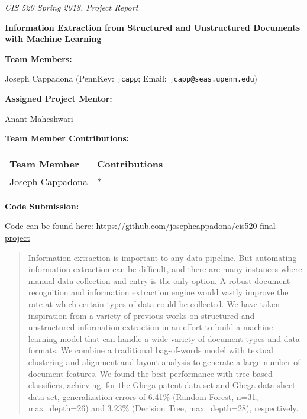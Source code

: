 \documentclass[twoside,11pt]{article}
\renewcommand{\>}{{\rightarrow}}
\newcommand{\1}{{\mathbf 1}}
\newcommand{\0}{{\mathbf 0}}
\begin{document}

\emph{\footnotesize{CIS 520 Spring 2018, Project Report}}

\vspace{12pt}

\textbf{\Large{Information Extraction from Structured and Unstructured Documents with Machine Learning}}

\vspace{1cm}

\textbf{Team Members:}

Joseph Cappadona (PennKey: \texttt{jcapp}; Email: \texttt{jcapp@seas.upenn.edu}) \\


\vspace{2cm}

\textbf{Assigned Project Mentor:}

Anant Maheshwari

\vspace{1cm}

\textbf{Team Member Contributions:}

\begin{center}
\begin{tabular}{|l|l|}
\hline
Team Member & Contributions \\
\hline
Joseph Cappadona & * \\
\hline
\end{tabular}
\end{center}

\vspace{12pt}

\textbf{Code Submission:}

Code can be found here: \url{https://github.com/josephcappadona/cis520-final-project}

\newpage

\begin{abstract}
Information extraction is important to any data pipeline. But automating information extraction can be difficult, and there are many instances where manual data collection and entry is the only option. A robust document recognition and information extraction engine would vastly improve the rate at which certain types of data could be collected. We have taken inspiration from a variety of previous works on structured and unstructured information extraction in an effort to build a machine learning model that can handle a wide variety of document types and data formats. We combine a traditional bag-of-words model with textual clustering and alignment and layout analysis to generate a large number of document features. We found the best performance with tree-based classifiers, achieving, for the Ghega patent data set and Ghega data-sheet data set, generalization errors of 6.41\% (Random Forest, n=31, max\_depth=26) and 3.23\% (Decision Tree, max\_depth=28), respectively.
\end{abstract}
\end{document}
